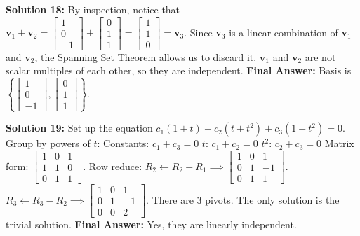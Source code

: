 \documentclass[11pt]{article}
\begin{document}
\vspace{0.5cm}
\textbf{Solution 18:}
By inspection, notice that $\mathbf{v}_1 + \mathbf{v}_2 = \begin{bmatrix} 1 \\ 0 \\ -1 \end{bmatrix} + \begin{bmatrix} 0 \\ 1 \\ 1 \end{bmatrix} = \begin{bmatrix} 1 \\ 1 \\ 0 \end{bmatrix} = \mathbf{v}_3$.
Since $\mathbf{v}_3$ is a linear combination of $\mathbf{v}_1$ and $\mathbf{v}_2$, the Spanning Set Theorem allows us to discard it. $\mathbf{v}_1$ and $\mathbf{v}_2$ are not scalar multiples of each other, so they are independent.
\textbf{Final Answer:} Basis is $\left\{ \begin{bmatrix} 1 \\ 0 \\ -1 \end{bmatrix}, \begin{bmatrix} 0 \\ 1 \\ 1 \end{bmatrix} \right\}$.

\vspace{0.5cm}
\textbf{Solution 19:}
Set up the equation $c_1(1+t) + c_2(t+t^2) + c_3(1+t^2) = 0$.
Group by powers of $t$:
Constants: $c_1 + c_3 = 0$
$t$: $c_1 + c_2 = 0$
$t^2$: $c_2 + c_3 = 0$
Matrix form: $\begin{bmatrix} 1 & 0 & 1 \\ 1 & 1 & 0 \\ 0 & 1 & 1 \end{bmatrix}$.
Row reduce: $R_2 \leftarrow R_2 - R_1 \implies \begin{bmatrix} 1 & 0 & 1 \\ 0 & 1 & -1 \\ 0 & 1 & 1 \end{bmatrix}$.
$R_3 \leftarrow R_3 - R_2 \implies \begin{bmatrix} 1 & 0 & 1 \\ 0 & 1 & -1 \\ 0 & 0 & 2 \end{bmatrix}$.
There are 3 pivots. The only solution is the trivial solution.
\textbf{Final Answer:} Yes, they are linearly independent.
\end{document}
